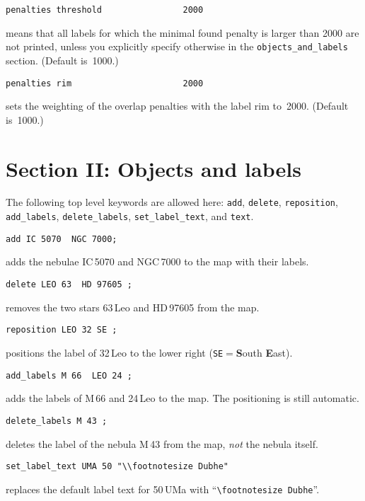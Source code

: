 \documentclass{article}
\newcommand{\subskip}{\bigskip\medskip}
\newcommand{\subsubskip}{\bigskip}
\begin{document}
\begin{multicols*}{3}
\begin{lstlisting}
penalties threshold                2000
\end{lstlisting}
means that all labels for which the minimal found penalty is larger than 2000
are not printed, unless you explicitly specify otherwise in the
\lstinline{objects_and_labels} section.  (Default is~1000.)\subsubskip

\begin{lstlisting}
penalties rim                      2000
\end{lstlisting}
sets the weighting of the overlap penalties with the label rim to~2000.
(Default is~1000.)
\fi


\section{Section II: Objects and labels}

The following top level keywords are allowed here: \lstinline{add},
\lstinline{delete}, \lstinline{reposition}, \lstinline{add_labels},
\lstinline{delete_labels}, \lstinline{set_label_text}, and
\lstinline{text}.\subskip

\begin{lstlisting}
add IC 5070  NGC 7000;
\end{lstlisting}
adds the nebulae IC\,5070 and NGC\,7000 to the map with their
labels.\subsubskip

\begin{lstlisting}
delete LEO 63  HD 97605 ;
\end{lstlisting}
removes the two stars 63\,Leo and HD\,97605 from the map.\subsubskip

\begin{lstlisting}
reposition LEO 32 SE ;
\end{lstlisting}
positions the label of 32\,Leo to the lower right (\lstinline{SE}${}={}$\textbf
South \textbf East).\subsubskip

\begin{lstlisting}
add_labels M 66  LEO 24 ;
\end{lstlisting}
adds the labels of M\,66 and 24\,Leo to the map.  The positioning is still
automatic.\subsubskip

\begin{lstlisting}
delete_labels M 43 ;
\end{lstlisting}
deletes the label of the nebula M\,43 from the map, \emph{not} the nebula
itself.\subsubskip

\begin{lstlisting}
set_label_text UMA 50 "\\footnotesize Dubhe"
\end{lstlisting}
replaces the default label text for 50\,UMa with
``\verb|\footnotesize Dubhe|''.\subsubskip



\end{multicols*}
\end{document}
